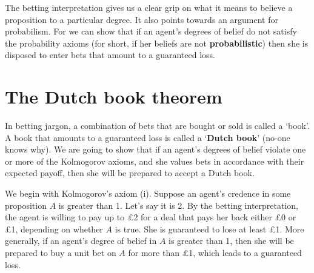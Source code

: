
The betting interpretation gives us a clear grip on what it means to believe a
proposition to a particular degree. It also points towards an argument for
probabilism. For we can show that if an agent's degrees of belief do not satisfy
the probability axioms (for short, if her beliefs are not
\textbf{probabilistic}) then she is disposed to enter bets that amount to a
guaranteed loss.

\section{The Dutch book theorem}


In betting jargon, a combination of bets that are bought or sold is called a
`book'. A book that amounts to a guaranteed loss is called a `\textbf{Dutch
  book}' (no-one knows why). We are going to show that if an agent's degrees of
belief violate one or more of the Kolmogorov axioms, and she values bets in
accordance with their expected payoff, then she will be prepared to accept a
Dutch book.

We begin with Kolmogorov's axiom (i). Suppose an agent's credence in some
proposition $A$ is greater than 1. Let's say it is 2. By the betting
interpretation, the agent is willing to pay up to £2 for a deal that pays her
back either £0 or £1, depending on whether $A$ is true. She is guaranteed to
lose at least £1. More generally, if an agent's degree of belief in $A$ is
greater than 1, then she will be prepared to buy a unit bet on $A$ for more than
£1, which leads to a guaranteed loss.

